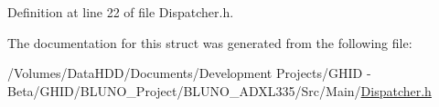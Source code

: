 \-Definition at line 22 of file \-Dispatcher.\-h.



\-The documentation for this struct was generated from the following file\-:\begin{DoxyCompactItemize}
\item 
/\-Volumes/\-Data\-H\-D\-D/\-Documents/\-Development Projects/\-G\-H\-I\-D -\/ Beta/\-G\-H\-I\-D/\-B\-L\-U\-N\-O\-\_\-\-Project/\-B\-L\-U\-N\-O\-\_\-\-A\-D\-X\-L335/\-Src/\-Main/\hyperlink{_dispatcher_8h}{\-Dispatcher.\-h}\end{DoxyCompactItemize}
